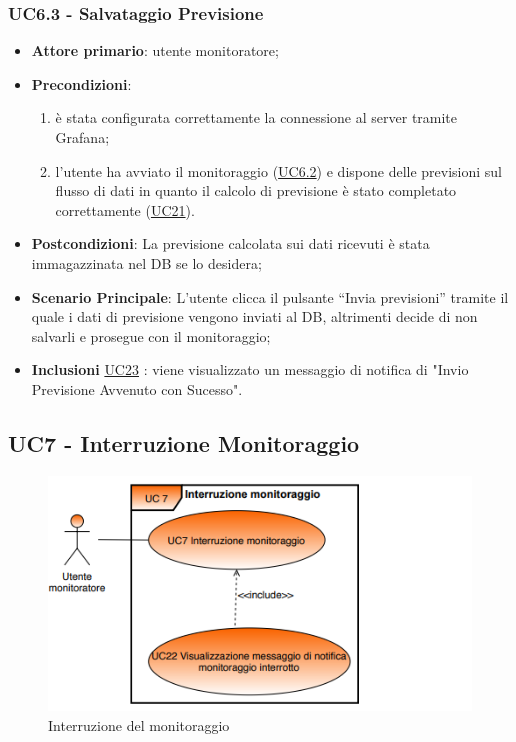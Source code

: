 	\subsubsection{UC6.3 - Salvataggio Previsione}
		\begin{itemize}
			\item\textbf{Attore primario}: utente monitoratore;
			\item\textbf{Precondizioni}: 
				\begin{enumerate}
					\item è stata configurata correttamente la connessione al server tramite Grafana;
					\item l’utente ha avviato il monitoraggio (\hyperref[par:UC6.2]{UC6.2}) e dispone delle previsioni sul flusso di dati in quanto il calcolo di previsione è stato completato correttamente  (\hyperref[par:UC21]{UC21}).
				\end{enumerate}
			\item\textbf{Postcondizioni}: La previsione calcolata sui dati ricevuti è stata immagazzinata nel DB se lo desidera;
			\item\textbf{Scenario Principale}: L’utente clicca il pulsante “Invia previsioni” tramite il quale i dati di previsione vengono inviati al DB, altrimenti decide di non salvarli e prosegue con il monitoraggio;
			\item\textbf{Inclusioni} \hyperref[par:UC23]{UC23} : viene visualizzato un messaggio di notifica di "Invio Previsione Avvenuto con Sucesso".
		\end{itemize}	


	\label{par:UC7}
	\subsection{UC7 - Interruzione Monitoraggio}

	\begin{figure}[H]
		\centering
		\includegraphics[scale=0.80]{../Analisi_dei_requisiti/img/Diagrammi_UML/UC7_Interruzione_monitoraggio.png}
		\caption{Interruzione del monitoraggio}
	\end{figure}

